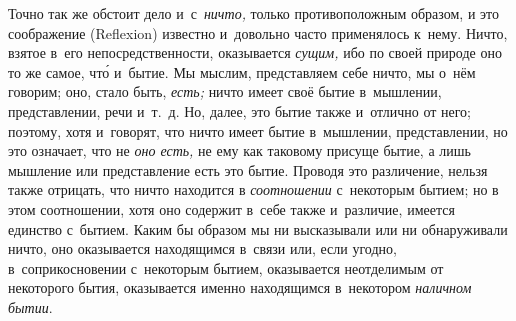 Точно так же обстоит дело и~с~{\em ничто,} только противоположным образом,
и это соображение (Reflexion) известно и~довольно часто применялось к~нему.
Ничто, взятое в~его непосредственности, оказывается {\em сущим,} ибо по своей
природе оно то же самое, чт\'{о} и~бытие. Мы мыслим, представляем себе ничто,
мы о~нём говорим; оно, стало быть, {\em есть;} ничто имеет своё бытие
в~мышлении, представлении, речи и~т.~д. Но, далее, это бытие также и~отлично от
него; поэтому, хотя и~говорят, что ничто имеет бытие в~мышлении, представлении,
но это означает, что не {\em оно есть,} не ему как таковому присуще бытие, а
лишь мышление или представление есть это бытие. Проводя это различение, нельзя
также отрицать, что ничто находится в {\em соотношении} с~некоторым бытием; но
в этом соотношении, хотя оно содержит в~себе также и~различие, имеется единство
с~бытием. Каким бы образом мы ни высказывали или ни обнаруживали ничто, оно
оказывается находящимся в~связи или, если угодно, в~соприкосновении с~некоторым
бытием, оказывается неотделимым от некоторого бытия, оказывается именно
находящимся в~некотором {\em наличном бытии}.

